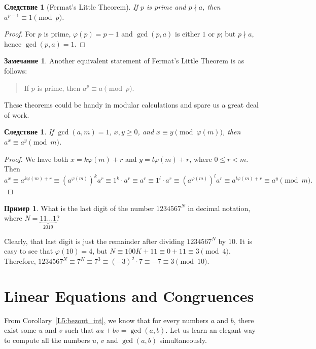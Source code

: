 \documentclass[12pt,notitlepage]{article}
\theoremstyle{plain}
\newtheorem{corr}[thm]{Следствие}
\theoremstyle{definition}
\newtheorem{exm}[thm]{Пример}
\newtheorem{rem}[thm]{Замечание}
\theoremstyle{plain}
\renewcommand{\phi}{\varphi}
\newcommand{\1}{\mathbf{1}}
\newcommand{\0}{\mathbf{0}}
\newcommand{\ndvd}{\mathop{\nmid}}
\begin{document}
\begin{corr}[Fermat's Little Theorem]
	If $p$ is prime and $p \ndvd a$, then $a^{p - 1} \equiv 1 \pmod p$.
\end{corr}
\begin{proof}
	For $p$ is prime, $\phi(p) = p - 1$ and $\gcd(p, a)$ is either $1$ or $p$; but $p \ndvd a$, hence $\gcd(p,a) = 1$.
\end{proof}
\begin{rem}
	Another equivalent statement of Fermat's Little Theorem is as follows:
	\begin{quote}
		If $p$ is prime, then $a^p \equiv a \pmod p$.
	\end{quote}
\end{rem}
\noindent  These theorems could be handy in modular calculations and spare us a great deal of work.
\begin{corr}
	If $\gcd(a, m) = 1$, $x, y \geq 0$, and $x \equiv y \pmod {\phi(m)}$, then $a^x \equiv a^y \pmod m$.
\end{corr}
\begin{proof}
	We have both $x = k\phi(m) + r$ and $y = l\phi(m) + r$, where $0 \leq r < m$. Then
	$$a^x \equiv a^{k\phi(m) + r} \equiv (a^{\phi(m)})^k a^r \equiv 1^k \cdot a^r \equiv a^r \equiv 1^l \cdot a^r \equiv (a^{\phi(m)})^l a^r \equiv a^{l\phi(m) + r} \equiv a^y \pmod m.$$
\end{proof}
\begin{exm}
	What is the last digit of the number $1234567^N$ in decimal notation, where $N = {\underbrace{11\ldots1}_{2019}}$?
	
	Clearly, that last digit is just the remainder after dividing $1234567^N$ by $10$. It is easy to see that $\phi(10) = 4$, but $N \equiv 100K + 11 \equiv 0 + 11 \equiv 3 \pmod 4$. Therefore, $1234567^N \equiv 7^N \equiv 7^3 \equiv (-3)^2 \cdot 7 \equiv -7 \equiv 3 \pmod{10}$.
\end{exm}



\section{Linear Equations and Congruences}

From Corollary~\ref{L5:bezout_int}, we know that for every numbers $a$ and $b$, there exist some $u$ and $v$ such that $a u + b v = \gcd(a,b)$. Let us learn an elegant way to compute all the numbers $u$, $v$ and $\gcd(a,b)$ simultaneously.
\end{document}
